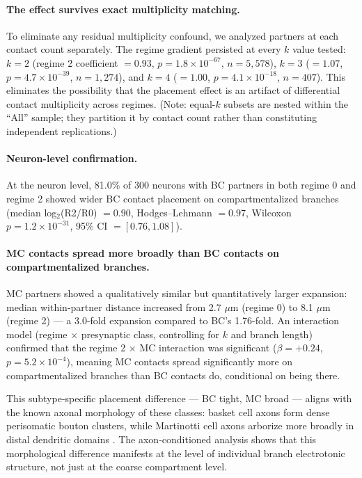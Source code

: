 \documentclass[11pt]{article}
\begin{document}
\paragraph{The effect survives exact multiplicity matching.} To eliminate any residual multiplicity confound, we analyzed partners at each contact count separately. The regime gradient persisted at every $k$ value tested: $k = 2$ (regime 2 coefficient $= 0.93$, $p = 1.8 \times 10^{-67}$, $n = 5{,}578$), $k = 3$ ($= 1.07$, $p = 4.7 \times 10^{-39}$, $n = 1{,}274$), and $k = 4$ ($= 1.00$, $p = 4.1 \times 10^{-18}$, $n = 407$). This eliminates the possibility that the placement effect is an artifact of differential contact multiplicity across regimes. (Note: equal-$k$ subsets are nested within the ``All'' sample; they partition it by contact count rather than constituting independent replications.)

\paragraph{Neuron-level confirmation.} At the neuron level, 81.0\% of 300 neurons with BC partners in both regime 0 and regime 2 showed wider BC contact placement on compartmentalized branches (median log$_2$(R2/R0) $= 0.90$, Hodges--Lehmann $= 0.97$, Wilcoxon $p = 1.2 \times 10^{-31}$, 95\% CI $= [0.76, 1.08]$).

\paragraph{MC contacts spread more broadly than BC contacts on compartmentalized branches.} MC partners showed a qualitatively similar but quantitatively larger expansion: median within-partner distance increased from 2.7 $\mu$m (regime 0) to 8.1 $\mu$m (regime 2) --- a 3.0-fold expansion compared to BC's 1.76-fold. An interaction model (regime $\times$ presynaptic class, controlling for $k$ and branch length) confirmed that the regime 2 $\times$ MC interaction was significant ($\beta = +0.24$, $p = 5.2 \times 10^{-4}$), meaning MC contacts spread significantly more on compartmentalized branches than BC contacts do, conditional on being there.

This subtype-specific placement difference --- BC tight, MC broad --- aligns with the known axonal morphology of these classes: basket cell axons form dense perisomatic bouton clusters, while Martinotti cell axons arborize more broadly in distal dendritic domains \citep{markram2004}. The axon-conditioned analysis shows that this morphological difference manifests at the level of individual branch electrotonic structure, not just at the coarse compartment level.
\end{document}

